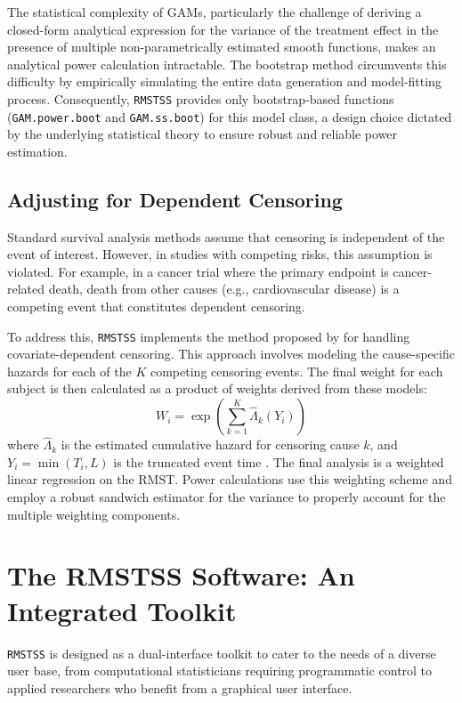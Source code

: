 \documentclass[article]{jss}
\begin{document}
The statistical complexity of GAMs, particularly the challenge of deriving a closed-form analytical expression for the variance of the treatment effect in the presence of multiple non-parametrically estimated smooth functions, makes an analytical power calculation intractable. The bootstrap method circumvents this difficulty by empirically simulating the entire data generation and model-fitting process. Consequently, \texttt{RMSTSS} provides only bootstrap-based functions (\texttt{GAM.power.boot} and \texttt{GAM.ss.boot}) for this model class, a design choice dictated by the underlying statistical theory to ensure robust and reliable power estimation.

\subsection{Adjusting for Dependent Censoring}
Standard survival analysis methods assume that censoring is independent of the event of interest. However, in studies with competing risks, this assumption is violated. For example, in a cancer trial where the primary endpoint is cancer-related death, death from other causes (e.g., cardiovascular disease) is a competing event that constitutes dependent censoring.

To address this, \texttt{RMSTSS} implements the method proposed by \citet{wang2018} for handling covariate-dependent censoring. This approach involves modeling the cause-specific hazards for each of the $K$ competing censoring events. The final weight for each subject is then calculated as a product of weights derived from these models:
\begin{equation}
W_i = \exp\left(\sum_{k=1}^{K} \hat{\Lambda}_{k}(Y_i)\right)
\end{equation}
where $\hat{\Lambda}_{k}$ is the estimated cumulative hazard for censoring cause $k$, and $Y_i = \min(T_i, L)$ is the truncated event time \cite{[1]}. The final analysis is a weighted linear regression on the RMST. Power calculations use this weighting scheme and employ a robust sandwich estimator for the variance to properly account for the multiple weighting components.

\section{The RMSTSS Software: An Integrated Toolkit}
\texttt{RMSTSS} is designed as a dual-interface toolkit to cater to the needs of a diverse user base, from computational statisticians requiring programmatic control to applied researchers who benefit from a graphical user interface.
\end{document}
